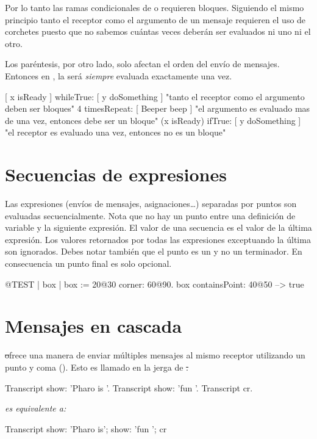 \documentclass[a4paper,10pt,twoside]{book}
\begin{document}
Por lo tanto las ramas condicionales de  o  requieren bloques. Siguiendo el mismo principio tanto el receptor como el argumento de un mensaje  requieren el uso de corchetes puesto que no sabemos cuántas veces deberán ser evaluados ni uno ni el otro.

Los paréntesis, por otro lado, solo afectan el orden del envío de mensajes.
Entonces en , la  será \emph{siempre} evaluada exactamente una vez.

\begin{code}{}
[ x isReady ] whileTrue: [ y doSomething ]   "tanto el receptor como el argumento deben ser bloques"
4 timesRepeat: [ Beeper beep ]                   "el argumento es evaluado mas de una vez, entonces debe ser un bloque"
(x isReady) ifTrue: [ y doSomething ]           "el receptor es evaluado una vez, entonces no es un bloque"
\end{code}

\section{Secuencias de expresiones}
Las expresiones (\ie envíos de mensajes, asignaciones\dots) separadas por puntos son evaluadas secuencialmente.
Nota que no hay un punto entre una definición de variable y la siguiente expresión.
El valor de una secuencia es el valor de la última expresión. Los valores retornados por todas las expresiones exceptuando la última son ignorados. Debes notar también que el punto es un  y no un terminador. En consecuencia un punto final es solo opcional.

\begin{code}{@TEST}
| box |
box := 20@30 corner: 60@90.
box containsPoint: 40@50 --> true
\end{code}

\section{Mensajes en cascada}
\st ofrece una manera de enviar múltiples mensajes al mismo receptor utilizando un punto y coma (\ct{;}). Esto es llamado  en la jerga de \st.


\begin{minipage}{0.35\textwidth}
\begin{code}{}
Transcript show: 'Pharo is '.
Transcript show: 'fun '.
Transcript cr.
\end{code}
\end{minipage}
\emph{es equivalente a:}
\begin{minipage}{0.35\textwidth}
\begin{code}{}
Transcript
   show: 'Pharo is';
   show: 'fun ';
   cr
\end{code}
\end{minipage}
\end{document}
